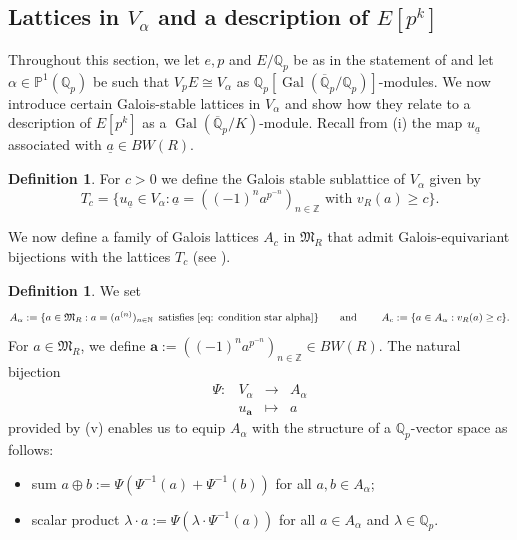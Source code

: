 \documentclass{amsart}
\newcommand{\op}[1]{\operatorname{#1}}
\theoremstyle{definition}
\newtheorem{definition}[theorem]{Definition}
\newcommand{\Q}{\mathbb{Q}}
\newcommand{\Gal}{\operatorname{Gal}}
\numberwithin{theorem}{section}
\numberwithin{equation}{section}
\begin{document}
\subsection{Lattices in $V_\alpha$ and a description of $E[p^k]$} \label{sect: lattices in Valpha}
Throughout this section, we let $e, p$ and $E/\Q_p$ be as in the statement of  and let $\alpha \in \mathbb{P}^1(\Q_p)$ be such that $V_pE \cong V_\alpha$ as $\Q_p[\Gal(\overline{\Q}_p/\Q_p)]$-modules.
We now introduce certain Galois-stable lattices in $V_\alpha$ and show how they relate to a description of $E[p^k]$ as a $\op{Gal}(\overline{\Q}_p/K)$-module.
Recall from (i) the map $u_{\underline{a}}$ associated with $\underline{a} \in BW(R)$. 
\begin{definition}\label{def: Tc}
For $c>0$ we define the Galois stable sublattice of $V_\alpha$ given by
\[
T_c = \{ u_{\underline{a}} \in V_\alpha : \underline{a} = ((-1)^na^{p^{-n}})_{n \in \mathbb{Z}} \text{ with } v_R(a) \geq c \}.
\]
\end{definition}

We now define a family of Galois lattices $A_c$ in $\mathfrak{M}_R$ that admit Galois-equivariant bijections with the lattices $T_c$ (see ).

\begin{definition}\label{def: A alpha and A c}
    We set
    \[
    A_\alpha := \{ a \in \mathfrak{M}_R : a=(a^{(n)})_{n \in \mathbb{N}} \,\text{ satisfies } \text{\Cref{eq: condition star alpha}} \} \qquad \text{and }  \qquad A_c := \{a \in A_\alpha : v_R(a) \geq c\}.
    \]
    For $a \in \mathfrak{M}_R$, we define $\mathbf{a}:=((-1)^na^{p^{-n}})_{n \in \mathbb{Z}} \in BW(R)$.
The natural bijection 
\[
\begin{array}{cccc}
\Psi: & V_\alpha & \to & A_\alpha \\
& u_{\mathbf{a}} & \mapsto & a
\end{array}
\]
provided by (v) enables us to equip $A_\alpha$ with the structure of a $\mathbb{Q}_p$-vector space as follows:
\begin{itemize}
    \item sum $a \oplus b := \Psi(\Psi^{-1}(a) + \Psi^{-1}(b))$ for all $a, b \in A_\alpha$;
    \item scalar product  $\lambda \cdot a := \Psi(\lambda \cdot \Psi^{-1}(a))$ for all $a \in A_\alpha$ and $\lambda \in \mathbb{Q}_p$.
\end{itemize}
\end{definition}
\end{document}
